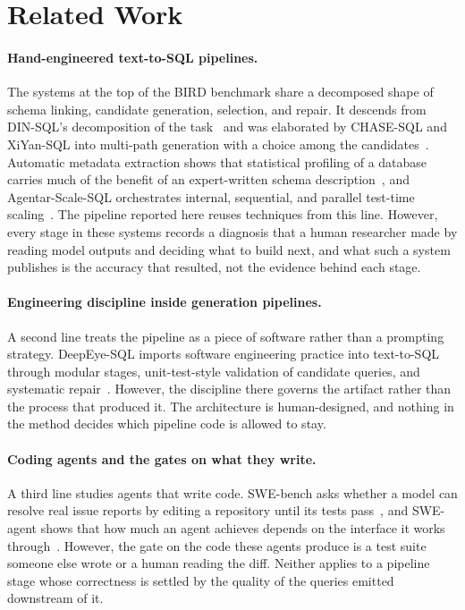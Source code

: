 \section{Related Work}
\label{sec:related-work}

\paragraph{Hand-engineered text-to-SQL pipelines.} The systems at the top of
the BIRD benchmark share a decomposed shape of schema linking, candidate
generation, selection, and repair. It descends from DIN-SQL's decomposition of
the task~\cite{din-sql} and was elaborated by CHASE-SQL and XiYan-SQL into
multi-path generation with a choice among the
candidates~\cite{chase-sql,xiyan-sql}. Automatic metadata extraction shows
that statistical profiling of a database carries much of the benefit of an
expert-written schema description~\cite{metadata-extraction}, and
Agentar-Scale-SQL orchestrates internal, sequential, and parallel test-time
scaling~\cite{agentar-scale-sql}. The pipeline reported here reuses techniques
from this line. However, every stage in these systems records a diagnosis that
a human researcher made by reading model outputs and deciding what to build
next, and what such a system publishes is the accuracy that resulted, not the
evidence behind each stage.

\paragraph{Engineering discipline inside generation pipelines.} A second line
treats the pipeline as a piece of software rather than a prompting strategy.
DeepEye-SQL imports software engineering practice into text-to-SQL through
modular stages, unit-test-style validation of candidate queries, and
systematic repair~\cite{deepeye-sql}. However, the discipline there governs
the artifact rather than the process that produced it. The architecture is
human-designed, and nothing in the method decides which pipeline code is
allowed to stay.

\paragraph{Coding agents and the gates on what they write.} A third line
studies agents that write code. SWE-bench asks whether a model can resolve
real issue reports by editing a repository until its tests
pass~\cite{swe-bench}, and SWE-agent shows that how much an agent achieves
depends on the interface it works through~\cite{swe-agent}. However, the gate
on the code these agents produce is a test suite someone else wrote or a human
reading the diff. Neither applies to a pipeline stage whose correctness is
settled by the quality of the queries emitted downstream of it.

